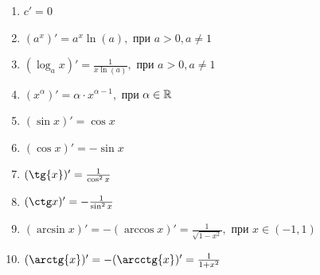     \begin{enumerate}
        \item $c' = 0$
        \item $(a^{x})' = a^{x} \ln(a),$ при $a > 0, a \neq 1$
        \item $(\log_{a}x)' = \frac{1}{x \ln(a)},$ при $a > 0, a \neq 1$
        \item $(x^{\alpha})' = \alpha \cdot x^{\alpha - 1},$ при $\alpha \in \mathbb{R}$
        \item $(\sin{x})' = \cos{x}$
        \item $(\cos{x})' = - \sin{x}$
        \item $(\tg{x})' = \frac{1}{\cos^{2}{x}}$
        \item $(\ctg x)' = - \frac{1}{\sin^{2}{x}}$
        \item $(\arcsin{x})' = - (\arccos{x})' = \frac{1}{\sqrt{1 - x^{2}}},$ при $x \in (-1, 1)$
        \item $(\arctg {x})' = - (\arcctg{x})' = \frac{1}{1 + x^{2}}$
    \end{enumerate}
    
